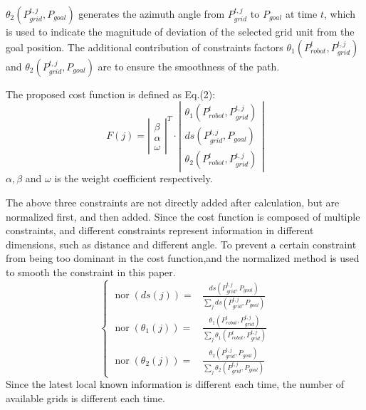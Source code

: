 \documentclass{iosart2c}
\begin{document}
$\!\theta_{2}(P_{grid}^{t, j}, P_{{goal}})\!$ generates the azimuth angle from $P_{{grid }}^{t, j}$ to $P_{{goal}}$ at time $t$, which is used to indicate the magnitude of deviation of the selected grid unit from the goal position. The additional contribution of constraints factors $\!\theta_{1}(P_{robot}^{t}, P_{{grid}}^{t, j})\!$ and $\!\theta_{2}(P_{grid}^{t, j}, P_{{goal}})\!$ are to ensure the smoothness of the path.

The proposed cost function is defined as Eq.(2):
\begin{equation}
F(j)=\left|\begin{array}{ll}
\beta \\
\alpha \\
\omega
\end{array}\right|^{T} \cdot\left|\begin{array}{l}
\theta_{1}\left(P_{robot}^{t}, P_{grid}^{t, j}\right) \\
d s\left(P_{grid}^{t, j}, P_{goal}\right) \\
\theta_{2}\left(P_{robot}^{t}, P_{grid}^{t, j}\right)
\end{array}\right|
\end{equation}
$\alpha, \beta$ and $\omega$ is the weight coefficient respectively.

The above three constraints are not directly added after calculation, but are normalized first, and then added. Since the cost function is composed of multiple constraints, and different constraints represent information in different dimensions, such as distance and different angle. To prevent a certain constraint from being too dominant in the cost function,and the normalized method is used to smooth the constraint in this paper.
\begin{equation}
\!\left\{\begin{aligned} \operatorname{nor}\left(ds(j)\right)=& \frac{ds\left(P_{grid}^{t, j}, P_{goal}\right)}{\sum\limits_{j} ds\left(P_{grid}^{t, j}, P_{goal}\right)} 
  \\ \operatorname{nor} \left(\theta_{1}(j)\right)=& \frac{\theta_{1}\left(P_{robot}^{t}, P_{grid}^{t, j}\right)}{\sum\limits_{j} \theta_{1}\left(P_{robo t}^{t}, P_{grid}^{t, j}\right)} 
  \\ \operatorname{nor} \left(\theta_{2}(j)\right)=& \frac{\theta_{2}\left(P_{grid}^{t, j}, P_{goa l}\right)}{\sum\limits_{j} \theta_{2}\left(P_{grid}^{t, j}, P_{goal}\right)} \end{aligned}\right.\!
\end{equation}
Since the latest local known information is different each time, the number of available grids is different each time.
\end{document}
